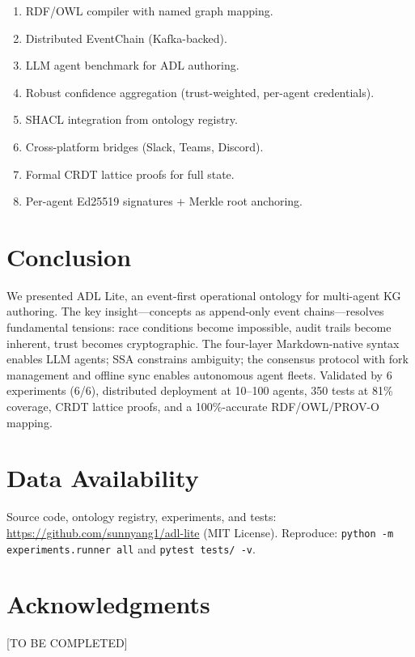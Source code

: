 \documentclass[11pt,a4paper]{article}
\theoremstyle{remark}
\begin{document}
\begin{enumerate}[label=(\arabic*)]
    \item RDF/OWL compiler with named graph mapping.
    \item Distributed EventChain (Kafka-backed).
    \item LLM agent benchmark for ADL authoring.
    \item Robust confidence aggregation (trust-weighted, per-agent credentials).
    \item SHACL integration from ontology registry.
    \item Cross-platform bridges (Slack, Teams, Discord).
    \item Formal CRDT lattice proofs for full state.
    \item Per-agent Ed25519 signatures + Merkle root anchoring.
\end{enumerate}

\section{Conclusion}
\label{sec:conclusion}

We presented ADL Lite, an event-first operational ontology for multi-agent KG authoring. The key insight---concepts as append-only event chains---resolves fundamental tensions: race conditions become impossible, audit trails become inherent, trust becomes cryptographic. The four-layer Markdown-native syntax enables LLM agents; SSA constrains ambiguity; the consensus protocol with fork management and offline sync enables autonomous agent fleets. Validated by 6 experiments (6/6), distributed deployment at 10--100 agents, 350 tests at 81\% coverage, CRDT lattice proofs, and a 100\%-accurate RDF/OWL/PROV-O mapping.

\section*{Data Availability}
Source code, ontology registry, experiments, and tests: \url{https://github.com/sunnyang1/adl-lite} (MIT License). Reproduce: \texttt{python -m experiments.runner all} and \texttt{pytest tests/ -v}.

\section*{Acknowledgments}
[TO BE COMPLETED]



\end{document}
